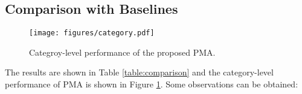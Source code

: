 \subsection{Comparison with Baselines}


\begin{table}
\centering
\caption{Performance of baselines and the proposed PMA on the CityEQA tasks. (PMA-7 means the PMA uses 7 steps to perform collection sub-tasks)}
\label{table:comparison}
\renewcommand\arraystretch{1.2}
\end{table}


\begin{figure}[!htb]
\centering
    \texttt{[image: figures/category.pdf]}
\caption{Categroy-level performance of the proposed PMA.}
\label{fig:category}
\end{figure}

The results are shown in Table \ref{table:comparison} and the category-level performance of PMA is shown in Figure \ref{fig:category}. Some observations can be obtained:

